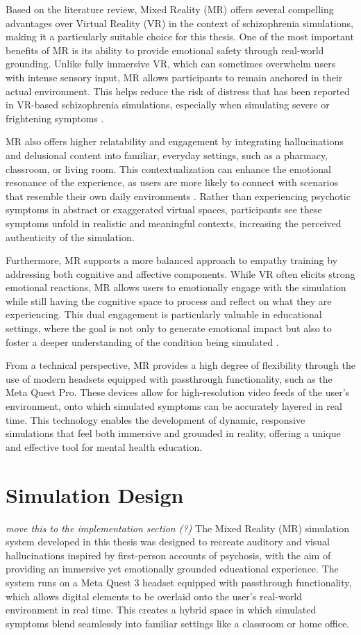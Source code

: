 Based on the literature review, Mixed Reality (MR) offers several compelling advantages over Virtual Reality (VR) in the context of schizophrenia simulations, making it a particularly suitable choice for this thesis. One of the most important benefits of MR is its ability to provide emotional safety through real-world grounding. Unlike fully immersive VR, which can sometimes overwhelm users with intense sensory input, MR allows participants to remain anchored in their actual environment. This helps reduce the risk of distress that has been reported in VR-based schizophrenia simulations, especially when simulating severe or frightening symptoms \cite{Zare-Bidaki2022}.

MR also offers higher relatability and engagement by integrating hallucinations and delusional content into familiar, everyday settings, such as a pharmacy, classroom, or living room. This contextualization can enhance the emotional resonance of the experience, as users are more likely to connect with scenarios that resemble their own daily environments \cite{Krogmeier2024}. Rather than experiencing psychotic symptoms in abstract or exaggerated virtual spaces, participants see these symptoms unfold in realistic and meaningful contexts, increasing the perceived authenticity of the simulation.

Furthermore, MR supports a more balanced approach to empathy training by addressing both cognitive and affective components. While VR often elicits strong emotional reactions, MR allows users to emotionally engage with the simulation while still having the cognitive space to process and reflect on what they are experiencing. This dual engagement is particularly valuable in educational settings, where the goal is not only to generate emotional impact but also to foster a deeper understanding of the condition being simulated \cite{Martingano2021, Rueda2020}.

From a technical perspective, MR provides a high degree of flexibility through the use of modern headsets equipped with passthrough functionality, such as the Meta Quest Pro. These devices allow for high-resolution video feeds of the user’s environment, onto which simulated symptoms can be accurately layered in real time. This technology enables the development of dynamic, responsive simulations that feel both immersive and grounded in reality, offering a unique and effective tool for mental health education.

\section{Simulation Design}
\emph{move this to the implementation section (?)}
The Mixed Reality (MR) simulation system developed in this thesis was designed to recreate auditory and visual hallucinations inspired by first-person accounts of psychosis, with the aim of providing an immersive yet emotionally grounded educational experience. The system runs on a Meta Quest 3 headset equipped with passthrough functionality, which allows digital elements to be overlaid onto the user's real-world environment in real time. This creates a hybrid space in which simulated symptoms blend seamlessly into familiar settings like a classroom or home office.

